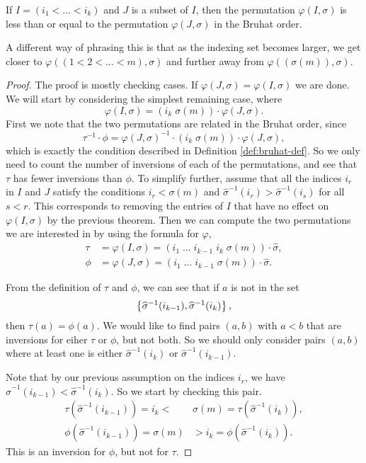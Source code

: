 \begin{theorem}
  \label{thm:bruhat-ord}
  If $I = (i_1 < \dots < i_k)$ and $J$ is a subset of $I$, then the
  permutation $\varphi(I,\sigma)$ is less than or equal to the
  permutation $\varphi(J,\sigma)$ in the Bruhat order.
\end{theorem}
A different way of phrasing this is that as the indexing set becomes
larger, we get closer to $\varphi\left((1 < 2 < \dots <
  m),\sigma\right)$ and further away from
$\varphi\left((\sigma(m)),\sigma\right)$.
\begin{proof}
  The proof is mostly checking cases. If $\varphi(J,\sigma) =
  \varphi(I,\sigma)$ we are done. We will start by considering the
  simplest remaining case, where
  \[ \varphi(I,\sigma) = (i_k \; \sigma(m)) \cdot 
  \varphi(J,\sigma). \]
  First we note that the two permutations are related in the Bruhat
  order, since
  \[ \tau^{-1} \cdot \phi = \varphi(J,\sigma)^{-1} \cdot
  (i_k\;\sigma(m)) \cdot \varphi(J,\sigma), \]
  which is exactly the condition described in Definition
  \ref{def:bruhat-def}. So
  we only need to count the number of inversions of each of the
  permutations, and
  see that $\tau$ has fewer inversions than $\phi$.
  To simplify further, assume that all the indices $i_r$ in $I$ and
  $J$ satisfy the conditions $i_r < \sigma(m)$ and
  $\widehat{\sigma}^{-1}(i_r) > \widehat{\sigma}^{-1}(i_s)$ for all $s
  < r$. This corresponds to removing the entries of $I$ that have no
  effect on $\varphi(I,\sigma)$ by the previous theorem. Then we can
  compute the two permutations we are interested in by using the
  formula for $\varphi$,
  \begin{align*}
    \tau &= \varphi(I,\sigma) = (i_1\;\dots\;i_{k-1}\;i_k\;\sigma(m))
           \cdot \widehat{\sigma}, \\
    \phi &= \varphi(J,\sigma) = (i_1\;\dots\;i_{k-1}\;\sigma(m)) \cdot
    \widehat{\sigma}.
  \end{align*}

  From the
  definition of $\tau$ and $\phi$, we can see that if $a$ is not in
  the set
  \[
  \left\{ \widehat{\sigma}^{-1}(i_{k-1}),\widehat{\sigma}^{-1}(i_{k}) \right\},
  \]
  then $\tau(a) = \phi(a)$. We would like to find pairs $(a,b)$
  with $a < b$ that are inversions for eiher $\tau$ or $\phi$, but not
  both. So we should only consider pairs $(a,b)$ where at least one is
  either $\widehat{\sigma}^{-1}(i_k)$ or
  $\widehat{\sigma}^{-1}(i_{k-1})$.

  Note that by our previous assumption on the indices $i_r$, we have 
  $\widehat{\sigma}^{-1}(i_{k-1}) < \widehat{\sigma}^{-1}(i_{k})$. So
  we start by checking this pair.
  \begin{align*}
    \tau(\widehat{\sigma}^{-1}(i_{k-1})) = i_k <\,& \sigma(m) =
    \tau(\widehat{\sigma}^{-1}(i_{k})), \\
    \phi(\widehat{\sigma}^{-1}(i_{k-1})) = \sigma(m) &> i_k =
    \phi(\widehat{\sigma}^{-1}(i_{k})).
  \end{align*}
  This is an inversion for $\phi$, but not for $\tau$. 


\end{proof}

